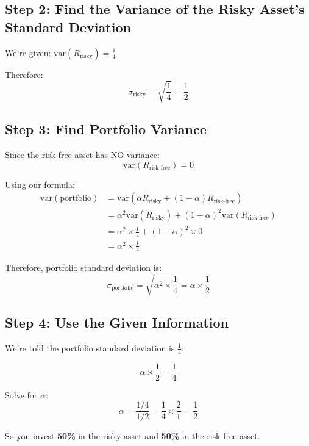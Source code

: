 \documentclass[12pt]{article}
\begin{document}
\subsection*{\large Step 2: Find the Variance of the Risky Asset's Standard Deviation}

We're given: $\text{var}(R_{\text{risky}}) = \frac{1}{4}$

Therefore:
\[
\sigma_{\text{risky}} = \sqrt{\frac{1}{4}} = \frac{1}{2}
\]

\newpage

\subsection*{\large Step 3: Find Portfolio Variance}

Since the risk-free asset has NO variance:
\[
\text{var}(R_{\text{risk-free}}) = 0
\]

Using our formula:
\begin{align*}
\text{var}(\text{portfolio}) &= \text{var}(\alpha R_{\text{risky}} + (1-\alpha) R_{\text{risk-free}}) \\
&= \alpha^2 \text{var}(R_{\text{risky}}) + (1-\alpha)^2 \text{var}(R_{\text{risk-free}}) \\
&= \alpha^2 \times \frac{1}{4} + (1-\alpha)^2 \times 0 \\
&= \alpha^2 \times \frac{1}{4}
\end{align*}

\vspace{1em}

Therefore, portfolio standard deviation is:
\[
\sigma_{\text{portfolio}} = \sqrt{\alpha^2 \times \frac{1}{4}} = \alpha \times \frac{1}{2}
\]

\vspace{2em}

\subsection*{\large Step 4: Use the Given Information}

We're told the portfolio standard deviation is $\frac{1}{4}$:

\[
\alpha \times \frac{1}{2} = \frac{1}{4}
\]

Solve for $\alpha$:
\[
\alpha = \frac{1/4}{1/2} = \frac{1}{4} \times \frac{2}{1} = \frac{1}{2}
\]

\vspace{1em}

\begin{center}
\colorbox{yellow!30}{
\large
So you invest \textbf{50\%} in the risky asset and \textbf{50\%} in the risk-free asset.
}
\end{center}
\end{document}
